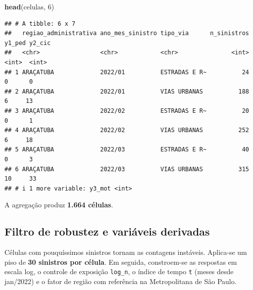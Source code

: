\documentclass[
  11pt,
]{article}
\newenvironment{Shaded}{\begin{snugshade}}{\end{snugshade}}
\newcommand{\DecValTok}[1]{\textcolor[rgb]{0.00,0.00,0.81}{#1}}
\newcommand{\FunctionTok}[1]{\textcolor[rgb]{0.13,0.29,0.53}{\textbf{#1}}}
\newcommand{\NormalTok}[1]{#1}
\begin{document}
\begin{Shaded}
\begin{Highlighting}[]
\FunctionTok{head}\NormalTok{(celulas, }\DecValTok{6}\NormalTok{)}
\end{Highlighting}
\end{Shaded}

\begin{verbatim}
## # A tibble: 6 x 7
##   regiao_administrativa ano_mes_sinistro tipo_via      n_sinistros y1_ped y2_cic
##   <chr>                 <chr>            <chr>               <int>  <int>  <int>
## 1 ARAÇATUBA             2022/01          ESTRADAS E R~          24      0      0
## 2 ARAÇATUBA             2022/01          VIAS URBANAS          188      6     13
## 3 ARAÇATUBA             2022/02          ESTRADAS E R~          20      0      1
## 4 ARAÇATUBA             2022/02          VIAS URBANAS          252      6     18
## 5 ARAÇATUBA             2022/03          ESTRADAS E R~          40      0      3
## 6 ARAÇATUBA             2022/03          VIAS URBANAS          315     10     33
## # i 1 more variable: y3_mot <int>
\end{verbatim}

A agregação produz \textbf{1.664 células}.

\subsection{Filtro de robustez e variáveis
derivadas}\label{filtro-de-robustez-e-variuxe1veis-derivadas}

Células com pouquíssimos sinistros tornam as contagens instáveis.
Aplica-se um piso de \textbf{30 sinistros por célula}. Em seguida,
constroem-se as respostas em escala log, o controle de exposição
\texttt{log\_n}, o índice de tempo \texttt{t} (meses desde jan/2022) e o
fator de região com referência na Metropolitana de São Paulo.
\end{document}
